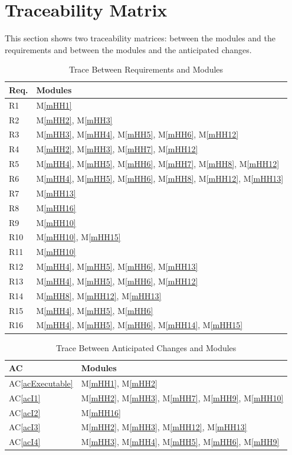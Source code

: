\documentclass[12pt, titlepage]{article}
\newcommand{\acref}[1]{AC\ref{#1}}
\newcommand{\mref}[1]{M\ref{#1}}
\begin{document}
\section{Traceability Matrix} \label{SecTM}
This section shows two traceability matrices: between the modules and the
requirements and between the modules and the anticipated changes.
\begin{table}[H]
\centering
\begin{tabular}{p{} p{}}
\toprule
\textbf{Req.} & \textbf{Modules}\\
\midrule
R1 & \mref{mHH1}\\
R2 & \mref{mHH2}, \mref{mHH3}\\
R3 & \mref{mHH3}, \mref{mHH4}, \mref{mHH5}, \mref{mHH6}, \mref{mHH12}\\
R4 & \mref{mHH2}, \mref{mHH3}, \mref{mHH7}, \mref{mHH12}\\
R5 & \mref{mHH4}, \mref{mHH5}, \mref{mHH6}, \mref{mHH7}, \mref{mHH8}, \mref{mHH12}\\
R6 & \mref{mHH4}, \mref{mHH5}, \mref{mHH6}, \mref{mHH8}, \mref{mHH12}, \mref{mHH13}\\
R7 & \mref{mHH13}\\
R8 & \mref{mHH16}\\
R9 & \mref{mHH10}\\
R10 & \mref{mHH10}, \mref{mHH15}\\
R11 & \mref{mHH10}\\
R12 & \mref{mHH4}, \mref{mHH5}, \mref{mHH6}, \mref{mHH13}\\
R13 & \mref{mHH4}, \mref{mHH5}, \mref{mHH6}, \mref{mHH12}\\
R14 & \mref{mHH8}, \mref{mHH12}, \mref{mHH13}\\
R15 & \mref{mHH4}, \mref{mHH5}, \mref{mHH6}\\
R16 & \mref{mHH4}, \mref{mHH5}, \mref{mHH6}, \mref{mHH14}, \mref{mHH15}\\
\bottomrule
\end{tabular}
\caption{Trace Between Requirements and Modules}
\label{TblRT}
\end{table}

\begin{table}[H]
\centering
\begin{tabular}{p{} p{}}
\toprule
\textbf{AC} & \textbf{Modules}\\
\midrule
\acref{acExecutable} & \mref{mHH1}, \mref{mHH2}\\
\acref{acI1} & \mref{mHH2}, \mref{mHH3}, \mref{mHH7}, \mref{mHH9}, \mref{mHH10}\\
\acref{acI2} & \mref{mHH16}\\
\acref{acI3} & \mref{mHH2}, \mref{mHH3}, \mref{mHH12}, \mref{mHH13}\\
\acref{acI4} & \mref{mHH3}, \mref{mHH4}, \mref{mHH5}, \mref{mHH6}, \mref{mHH9}\\
\bottomrule
\end{tabular}
\caption{Trace Between Anticipated Changes and Modules}
\label{TblACT}
\end{table}
\end{document}
